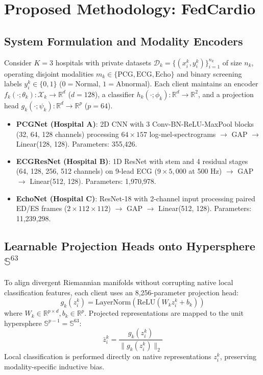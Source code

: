 \documentclass[conference]{IEEEtran}
\begin{document}
\section{Proposed Methodology: FedCardio}

\subsection{System Formulation and Modality Encoders}
Consider $K=3$ hospitals with private datasets $\mathcal{D}_k = \{(x_i^k, y_i^k)\}_{i=1}^{n_k}$ of size $n_k$, operating disjoint modalities $m_k \in \{\text{PCG}, \text{ECG}, \text{Echo}\}$ and binary screening labels $y_i^k \in \{0, 1\}$ ($0 = \text{Normal}$, $1 = \text{Abnormal}$). Each client maintains an encoder $f_k(\cdot; \theta_k): \mathcal{X}_k \to \mathbb{R}^d$ ($d=128$), a classifier $h_k(\cdot; \phi_k): \mathbb{R}^d \to \mathbb{R}^2$, and a projection head $g_k(\cdot; \psi_k): \mathbb{R}^d \to \mathbb{R}^p$ ($p=64$).
\begin{itemize}
    \item \textbf{PCGNet (Hospital A)}: 2D CNN with 3 Conv-BN-ReLU-MaxPool blocks (32, 64, 128 channels) processing $64 \times 157$ log-mel-spectrograms $\to$ GAP $\to$ Linear(128, 128). Parameters: 355,426.
    \item \textbf{ECGResNet (Hospital B)}: 1D ResNet with stem and 4 residual stages (64, 128, 256, 512 channels) on 9-lead ECG ($9 \times 5,000$ at 500 Hz) $\to$ GAP $\to$ Linear(512, 128). Parameters: 1,970,978.
    \item \textbf{EchoNet (Hospital C)}: ResNet-18 with 2-channel input processing paired ED/ES frames ($2 \times 112 \times 112$) $\to$ GAP $\to$ Linear(512, 128). Parameters: 11,239,298.
\end{itemize}

\subsection{Learnable Projection Heads onto Hypersphere $\mathbb{S}^{63}$}
To align divergent Riemannian manifolds without corrupting native local classification features, each client uses an 8,256-parameter projection head:
\begin{equation}
    g_k(z_i^k) = \text{LayerNorm}(\text{ReLU}(W_k z_i^k + b_k))
\end{equation}
where $W_k \in \mathbb{R}^{p \times d}, b_k \in \mathbb{R}^p$. Projected representations are mapped to the unit hypersphere $\mathbb{S}^{p-1} = \mathbb{S}^{63}$:
\begin{equation}
    \bar{z}_i^k = \frac{g_k(z_i^k)}{\|g_k(z_i^k)\|_2}
\end{equation}
Local classification is performed directly on native representations $z_i^k$, preserving modality-specific inductive bias.
\end{document}
